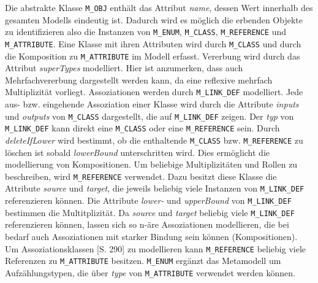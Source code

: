 Die abstrakte Klasse \texttt{M\_OBJ} enth\"alt das Attribut \textit{name}, dessen Wert innerhalb des gesamten Modells eindeutig ist. Dadurch wird es m\"oglich die erbenden Objekte zu identifizieren also die Instanzen von \texttt{M\_ENUM}, \texttt{M\_CLASS}, \texttt{M\_REFERENCE} und \texttt{M\_ATTRIBUTE}.
Eine Klasse mit ihren Attributen wird durch \texttt{M\_CLASS} und durch die Komposition zu \texttt{M\_ATTRIBUTE} im Modell erfasst. Vererbung wird durch das Attribut \textit{superTypes} modelliert. Hier ist anzumerken, dass auch Mehrfachvererbung dargestellt werden kann, da eine reflexive mehrfach Multiplizität vorliegt. 
Assoziationen werden durch \texttt{M\_\-LINK\-\_DEF} modelliert. Jede aus- bzw. eingehende Assoziation einer Klasse wird durch die Attribute \textit{inputs} und \textit{outputs} von \texttt{M\_CLASS} dargestellt, die auf \texttt{M\_LINK\_DEF} zeigen. Der \textit{typ} von \texttt{M\_\-LINK\_\-DEF} kann direkt eine \texttt{M\_CLASS} oder eine \texttt{M\_REFERENCE} sein. Durch \textit{deleteIfLower} wird bestimmt, ob die enthaltende \texttt{M\_CLASS} bzw. \texttt{M\_REFERENCE} zu löschen ist sobald \textit{lowerBound} unterschritten wird. Dies erm\"oglicht die modellierung von Kompositionen. Um beliebige Multiplizitäten und Rollen zu beschreiben, wird \texttt{M\_REFERENCE} verwendet. Dazu besitzt diese Klasse die Attribute \textit{source} und \textit{target}, die jeweils beliebig viele Instanzen von \texttt{M\_LINK\_DEF} referenzieren können. Die Attribute \textit{lower-} und \textit{upperBound} von \texttt{M\_LINK\_DEF} bestimmen die Multitplizität. Da \textit{source} und \textit{target} beliebig viele \texttt{M\_LINK\_DEF} referenzieren k\"onnen, lassen sich so n-\"are Assoziationen modellieren, die bei bedarf auch Assoziationen mit starker Bindung sein k\"onnen (Kompositionen).\\
Um Assoziationsklassen \cite{larman2005book}[S. 290] zu modellieren kann \texttt{M\_\-REF\-ER\-ENCE} beliebig viele Referenzen zu \texttt{M\_AT\-TRI\-BUTE} besitzen. \texttt{M\_ENUM} erg\"anzt das Metamodell um Aufz\"ahlungstypen, die \"uber \textit{type} von \texttt{M\_ATTRIBUTE} verwendet werden k\"onnen.\\
